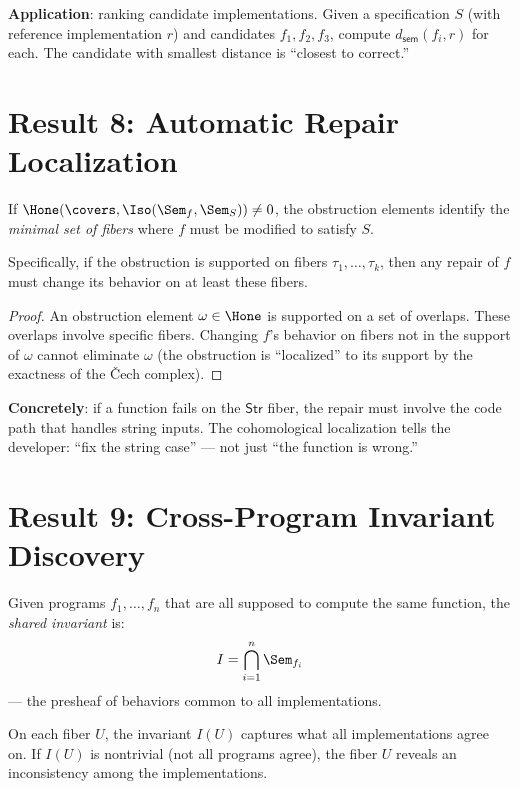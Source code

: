 \textbf{Application}: ranking candidate implementations.  Given a
specification $S$ (with reference implementation $r$) and candidates
$f_1, f_2, f_3$, compute $d_\mathsf{sem}(f_i, r)$ for each.
The candidate with smallest distance is ``closest to correct.''

\section{Result 8: Automatic Repair Localization}

\begin{theorem}
\label{thm:repair}
If $\Hone(\covers, \Iso(\Sem_f, \Sem_S)) \neq 0$, the obstruction
elements identify the \emph{minimal set of fibers} where $f$ must
be modified to satisfy $S$.

Specifically, if the obstruction is supported on fibers
$\tau_1, \ldots, \tau_k$, then any repair of $f$ must change its
behavior on at least these fibers.
\end{theorem}

\begin{proof}
An obstruction element $\omega \in \Hone$ is supported on a set of
overlaps.  These overlaps involve specific fibers.  Changing $f$'s
behavior on fibers not in the support of $\omega$ cannot eliminate
$\omega$ (the obstruction is ``localized'' to its support by the
exactness of the \v{C}ech complex).
\end{proof}

\textbf{Concretely}: if a function fails on the $\mathsf{Str}$ fiber,
the repair must involve the code path that handles string inputs.
The cohomological localization tells the developer: ``fix the string
case'' --- not just ``the function is wrong.''

\section{Result 9: Cross-Program Invariant Discovery}

\begin{theorem}
\label{thm:invariant}
Given programs $f_1, \ldots, f_n$ that are all supposed to compute
the same function, the \emph{shared invariant} is:
\[
  I = \bigcap_{i=1}^n \Sem_{f_i}
\]
--- the presheaf of behaviors common to all implementations.

On each fiber $U$, the invariant $I(U)$ captures what all
implementations agree on.  If $I(U)$ is nontrivial (not all
programs agree), the fiber $U$ reveals an inconsistency among the
implementations.
\end{theorem}

